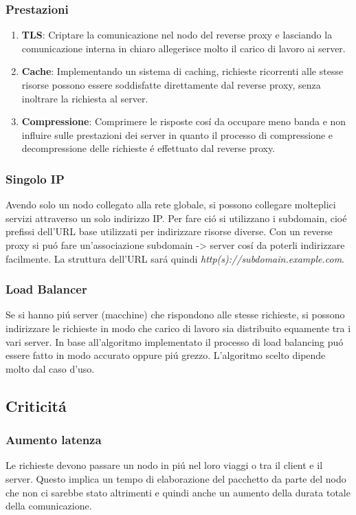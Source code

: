 \subsubsection{Prestazioni}
\begin{enumerate}
  \item \textbf{TLS}: Criptare la comunicazione nel nodo del reverse proxy e lasciando la comunicazione interna in chiaro allegerisce molto il carico di lavoro ai server.
  \item \textbf{Cache}: Implementando un sistema di caching, richieste ricorrenti alle stesse risorse possono essere soddisfatte direttamente dal reverse proxy, senza inoltrare la richiesta al server.
  \item \textbf{Compressione}: Comprimere le risposte cosí da occupare meno banda e non influire sulle prestazioni dei server in quanto il processo di compressione e decompressione delle richieste é effettuato dal reverse proxy.
\end{enumerate}

\subsubsection{Singolo IP}
Avendo solo un nodo collegato alla rete globale, si possono collegare molteplici servizi attraverso un solo indirizzo IP. Per fare ció si utilizzano i subdomain, cioé prefissi dell'URL base utilizzati per indirizzare risorse diverse. Con un reverse proxy si puó fare un'associazione subdomain -> server cosí da poterli indirizzare facilmente. La struttura dell'URL sará quindi \textit{http(s)://subdomain.example.com}.

\subsubsection{Load Balancer}
Se si hanno piú server (macchine) che rispondono alle stesse richieste, si possono indirizzare le richieste in modo che carico di lavoro sia distribuito equamente tra i vari server. In base all'algoritmo implementato il processo di load balancing puó essere fatto in modo accurato oppure piú grezzo. L'algoritmo scelto dipende molto dal caso d'uso.

\subsection{Criticitá}
\cite{risks}
\subsubsection{Aumento latenza}
Le richieste devono passare un nodo in piú nel loro viaggi o tra il client e il server. Questo implica un tempo di elaborazione del pacchetto da parte del nodo che non ci sarebbe stato altrimenti e quindi anche un aumento della durata totale della comunicazione.
